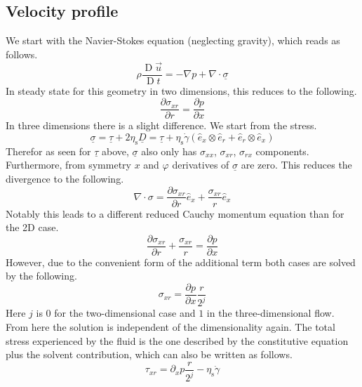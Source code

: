 \documentclass[a4paper,12pt]{scrartcl}
\newcommand{\ma}[1]{\underline{#1}}
\DeclareMathOperator{\Dif}{D}
\begin{document}
\subsection{Velocity profile}
We start with the Navier-Stokes equation (neglecting gravity), which reads as follows.
\begin{equation}
	\rho\frac{\Dif\vec{u}}{\Dif t} = -\nabla p + \nabla\cdot\ma{\sigma}
\end{equation}
In steady state for this geometry in two dimensions, this reduces to the following.
\begin{equation}
	\frac{\partial \sigma_{xr}}{\partial r} = \frac{\partial p}{\partial x}
\end{equation}
In three dimensions there is a slight difference. We start from the stress.
\begin{equation}
	\ma{\sigma} =  \ma{\tau} + 2\eta_\text{s}\ma{D} = \ma{\tau} + \eta_\text{s}\dot{\gamma}\left(\hat{e}_{x}\otimes\hat{e}_{r} + \hat{e}_{r}\otimes\hat{e}_{x}\right)
\end{equation}
Therefor as seen for $\ma{\tau}$ above, $\ma{\sigma}$ also only has $\sigma_{xx}$, $\sigma_{xr}$, $\sigma_{rx}$ components. Furthermore, from symmetry $x$ and $\varphi$ derivatives of $\ma{\sigma}$ are zero. This reduces the divergence to the following.
\begin{equation}
	\nabla\cdot\sigma = \frac{\partial \sigma_{xr}}{\partial r}\hat{e}_x + \frac{\sigma_{xr}}{r}\hat{e}_x
\end{equation}
Notably this leads to a different reduced Cauchy momentum equation than for the 2D case.
\begin{equation}
	\frac{\partial \sigma_{xr}}{\partial r} + \frac{\sigma_{xr}}{r} = \frac{\partial p}{\partial x}
\end{equation}
However, due to the convenient form of the additional term both cases are solved by the following.
\begin{equation}
	\sigma_{xr} = \frac{\partial p}{\partial x}\frac{r}{2^j}
\end{equation}
Here $j$ is $0$ for the two-dimensional case and $1$ in the three-dimensional flow. From here the solution is independent of the dimensionality again.
The total stress experienced by the fluid is the one described by the constitutive equation plus the solvent contribution, which can also be written as follows.
\begin{equation}
	\tau_{xr} = \partial_xp\frac{r}{2^j} - \eta_\text{s}\dot{\gamma}
\end{equation}
\end{document}
